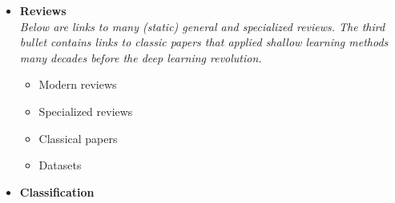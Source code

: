 \documentclass[12pt,letterpaper]{article}
\begin{document}
\begin{itemize}
\item \textbf{Reviews}
\\\textit{Below are links to many (static) general and specialized reviews.  The third bullet contains links to classic papers that applied shallow learning methods many decades before the deep learning revolution.}
	\begin{itemize}
		\item Modern reviews~\cite{Shanahan:2022ifi,Boehnlein:2021eym,Karagiorgi:2021ngt,Schwartz:2021ftp,Bourilkov:2019yoi,Carleo:2019ptp,Radovic:2018dip,Albertsson:2018maf,Guest:2018yhq,Larkoski:2017jix}
		\item Specialized reviews~\cite{Canelli:2025ybb,King:2025unw,Boggia:2025kbs,Cheng:2025khv,David:2025lsv,Caron:2025rir,Lawrence:2025rnk,Sarkar:2024vjz,Krause:2024avx,Malara:2024zsj,Duarte:2024lsg,Sahu:2024fzi,Halverson:2024hax,Larkoski:2024uoc,Barman:2024wfx,Ahmad:2024dql,Huetsch:2024quz,Mondal:2024nsa,Bardhan:2024zla,Kheddar:2024osf,Gooding:2024wpi,Araz:2023mda,Belis:2023mqs,Hashemi:2023rgo,Allaire:2023fgp,Du:2023qst,DeZoort:2023vrm,Zhou:2023pti,Huber:2022lpm,Huerta:2022kgj,Cheng:2022idp,Plehn:2022ftl,Chen:2022pzc,Benelli:2022sqn,Coadou:2022nsh,Harris:2022qtm,Thais:2022iok,Adelmann:2022ozp,Dvorkin:2022pwo,Butter:2022rso,Bogatskiy:2022hub,Viren:2022qon,Baldi:2022okj,Alanazi:2021grv,deLima:2021fwm,Guan:2020bdl,Kagan:2020yrm,Rousseau:2020rnz,Cranmer:2019eaq,Vlimant:2020enz,Duarte:2020ngm,Nachman:2020ccu,Brehmer:2020cvb,Forte:2020yip,Butter:2020tvl,Psihas:2020pby,Shlomi:2020gdn,1807719,Kasieczka:2019dbj}
		\item Classical papers~\cite{Lonnblad:1990bi,Denby:1987rk}
		\item Datasets~\cite{Barman:2025kqr,Amram:2024fjg,Krause:2024avx,Bhimji:2024bcd,Zoch:2024eyp,Rusack:2023pob,Eller:2023myr,Qu:2022mxj,Chen:2021euv,Govorkova:2021hqu,Benato:2021olt,Aarrestad:2021oeb,Kasieczka:2021xcg}
	\end{itemize}
\item \textbf{Classification}

\end{itemize}
\end{document}
